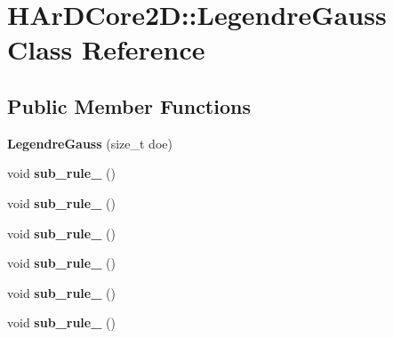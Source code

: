 \hypertarget{classHArDCore2D_1_1LegendreGauss}{}\section{H\+Ar\+D\+Core2D\+:\+:Legendre\+Gauss Class Reference}
\label{classHArDCore2D_1_1LegendreGauss}
\subsection*{Public Member Functions}
\begin{DoxyCompactItemize}
\item 
\mbox{\label{classHArDCore2D_1_1LegendreGauss_a4df4c78f50b0116cb68151073a45e08a}} 
{\bfseries Legendre\+Gauss} (size\+\_\+t doe)
\item 
\mbox{\label{classHArDCore2D_1_1LegendreGauss_aa60072df54f7acc9bad7362e4d6f6f72}} 
void {\bfseries sub\+\_\+rule\+\_} ()
\item 
\mbox{\label{classHArDCore2D_1_1LegendreGauss_a3b20f2cc13f96879fe731e3411e118cf}} 
void {\bfseries sub\+\_\+rule\+\_} ()
\item 
\mbox{\label{classHArDCore2D_1_1LegendreGauss_a0ee58d8688bfaaa7952cd7f70e06ad05}} 
void {\bfseries sub\+\_\+rule\+\_} ()
\item 
\mbox{\label{classHArDCore2D_1_1LegendreGauss_a55751cb4eed2cd44b12fe7bcc505097a}} 
void {\bfseries sub\+\_\+rule\+\_} ()
\item 
\mbox{\label{classHArDCore2D_1_1LegendreGauss_aa4e7cbaed5cea19a7490501e67bf728b}} 
void {\bfseries sub\+\_\+rule\+\_} ()
\item 
\mbox{\label{classHArDCore2D_1_1LegendreGauss_aff68078ed4cdc77372609b56c3fcfc2a}} 
void {\bfseries sub\+\_\+rule\+\_} ()
\item 
\mbox{\label{classHArDCore2D_1_1LegendreGauss_a70452a921cb1f1eb6e30d7436102ae01}} 

\end{DoxyCompactItemize}
